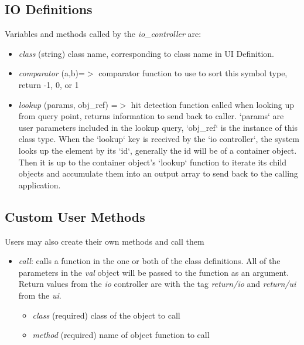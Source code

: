 \documentclass{article}
\def\iocontroller{\textit{io\_controller}\xspace}
\begin{document}
\subsection{IO Definitions}\label{sec:io_messages}

Variables and methods called by the \iocontroller are:

\begin{itemize}\itemsep0pt 
\item \textit{class} (string)  class name, corresponding to class name in UI Definition.
\item \textit{comparator} (a,b)=$>$ comparator function to use to sort this symbol type, return -1, 0, or 1
\item \textit{lookup} (params, obj\_ref) =$>$ hit detection function called when looking up from query point, returns information to send back to caller. `params` are user parameters included in the lookup query, `obj\_ref` is the instance of this class type. When the `lookup` key is received by the `io controller`, the system looks up the element by its `id`, generally the id will be of a container object. Then it is up to the container object's `lookup` function to iterate its child objects and accumulate them into an output array to send back to the calling application.
\end{itemize}


\subsection{Custom User Methods}\label{sec:call}

Users may also create their own methods and call them 

\begin{itemize}\itemsep0pt 
\item \textit{call}: calls a function in the one or both of the class definitions. All of the parameters in the \textit{val} object will be passed to the function as an argument. Return values from the \textit{io} controller are with the tag \textit{return/io} and \textit{return/ui} from the \textit{ui}.
\begin{itemize}\itemsep0pt 
  \item \textit{class} (required) class of the object to call
  \item \textit{method} (required) name of object function to call
\end{itemize}

\end{itemize}
\end{document}
